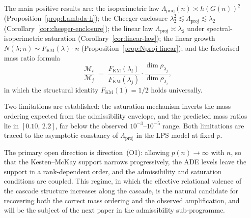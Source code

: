 \documentclass[12pt, a4paper]{article}
\theoremstyle{plain}
\theoremstyle{definition}
\theoremstyle{remark}
\begin{document}
    The main positive results are: the isoperimetric law
    $\Lambda_{\mathrm{proj}}(n) \asymp h(G(n))^2$
    (Proposition~\ref{prop:Lambda-h}); the Cheeger enclosure
    $\lambda_2^2 \lesssim \Lambda_{\mathrm{proj}} \lesssim \lambda_2$
    (Corollary~\ref{cor:cheeger-enclosure}); the linear law
    $\Lambda_{\mathrm{proj}} \asymp \lambda_2$ under spectral-isoperimetric
    saturation (Corollary~\ref{cor:linear-law}); the linear growth
    $N(\lambda; n) \sim F_{\mathrm{KM}}(\lambda) \cdot n$
    (Proposition~\ref{prop:Nproj-linear}); and the factorised mass ratio formula
    \[
      \frac{\mathcal{M}_i}{\mathcal{M}_j}
      \;=\;
      \frac{F_{\mathrm{KM}}(\lambda_i)}{F_{\mathrm{KM}}(\lambda_j)}
      \cdot
      \frac{\dim\rho_{\lambda_j}}{\dim\rho_{\lambda_i}},
    \]
    in which the structural identity $F_{\mathrm{KM}}(1) = 1/2$ holds universally.

    Two limitations are established: the saturation mechanism inverts the mass
    ordering expected from the admissibility envelope, and the predicted mass
    ratios lie in $[0.10,\, 2.2]$, far below the observed $10^{-3}$--$10^{-5}$
    range.
    Both limitations are traced to the asymptotic constancy of
    $\Lambda_{\mathrm{proj}}$ in the LPS model at fixed $p$.

    The primary open direction is direction~(O1): allowing $p(n) \to \infty$ with
    $n$, so that the Kesten--McKay support narrows progressively, the ADE levels
    leave the support in a rank-dependent order, and the admissibility and
    saturation conditions are coupled.
    This regime, in which the effective relational valence of the cascade structure
    increases along the cascade, is the natural candidate for recovering both the
    correct mass ordering and the observed amplification, and will be the subject
    of the next paper in the admissibility sub-programme.

    \clearpage
    
    
\end{document}
